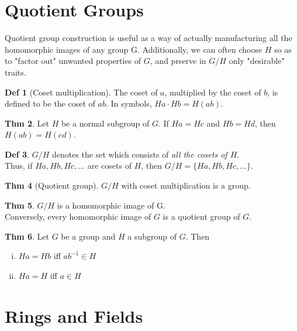 \documentclass{article}
\theoremstyle{definition}
\newtheorem{definition}{Def}[section]
\newtheorem{theorem}[definition]{Thm}
\begin{document}
\section{Quotient Groups}

Quotient group construction is useful as a way of actually manufacturing all the homomorphic images of any group G. Additionally, we can often choose $H$ so as to "factor out" unwanted properties of $G$, and prserve in $G/H$ only "desirable" traits.

\begin{definition}[Coset multiplication]
    The coset of $a$, multiplied by the coset of $b$, is defined to be the coset of $ab$. In symbols, $Ha \cdot Hb = H(ab)$.
\end{definition}

\begin{theorem}
    Let $H$ be a normal subgroup of $G$. If $Ha = Hc$ and $Hb = Hd$, then $H(ab) = H(cd)$.
\end{theorem}

\begin{definition}
    $G/H$ denotes the set which consists of \emph{all the cosets of $H$}.
    \\
    Thus, if $Ha, Hb, Hc, \ldots$ are cosets of $H$, then $G/H = \{ Ha, Hb, Hc, ... \}$.
\end{definition}

\begin{theorem}[Quotient group]
    $G/H$ with coset multiplication is a group.
\end{theorem}

\begin{theorem}
    $G/H$ is a homomorphic image of G.
    \\
    Conversely, every homomorphic image of $G$ is a quotient group of $G$.
\end{theorem}

\begin{theorem}
    Let $G$ be a group and $H$ a subgroup of $G$. Then
    \begin{enumerate}[i.]
	\item $Ha = Hb$ iff ${ab}^{-1} \in H$
	\item $Ha = H$ iff $a \in H$
    \end{enumerate}
\end{theorem}


\section{Rings and Fields}
\end{document}
